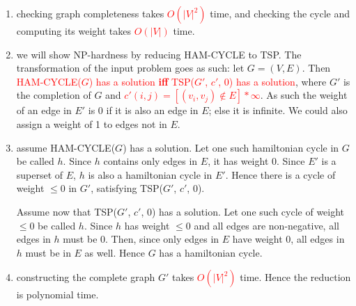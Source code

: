 \begin{enumerate}
  \item checking graph completeness takes \textcolor{red}{$O(|V|^2)$} time, and
    checking the cycle and computing its weight takes \textcolor{red}{$O(|V|)$}
    time.

  \item we will show NP-hardness by reducing HAM-CYCLE to TSP. The
    transformation of the input problem goes as such: let $G = (V, E)$. Then
    \textcolor{red}{HAM-CYCLE($G$) has a solution \textbf{iff} TSP($G'$, $c'$,
    0) has a solution}, where $G'$ is the completion of $G$ and
    \textcolor{red}{$c'(i, j) = [(v_i, v_j) \not \in E] * \infty$}. As such the
    weight of an edge in $E'$ is 0 if it is also an edge in $E$; else it is
    infinite. We could also assign a weight of 1 to edges not in $E$.

  \item assume HAM-CYCLE($G$) has a solution. Let one such hamiltonian cycle in
    $G$ be called $h$. Since $h$ contains only edges in $E$, it has weight 0.
    Since $E'$ is a superset of $E$, $h$ is also a hamiltonian cycle in $E'$.
    Hence there is a cycle of weight $\leq 0$ in $G'$, satisfying TSP($G'$,
    $c'$, 0).

    Assume now that TSP($G'$, $c'$, 0) has a solution. Let one such cycle of
    weight $\leq 0$ be called $h$. Since $h$ has weight $\leq 0$ and all edges
    are non-negative, all edges in $h$ must be 0. Then, since only edges in $E$
    have weight 0, all edges in $h$ must be in $E$ as well. Hence $G$ has a
    hamiltonian cycle.

  \item constructing the complete graph $G'$ takes \textcolor{red}{$O(|V|^2)$}
    time. Hence the reduction is polynomial time.

\end{enumerate}
